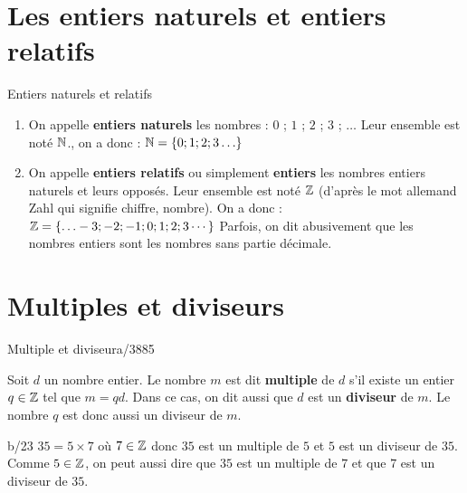 \begin{pageCours}


\section{Les entiers naturels et entiers relatifs}

\begin{DefLTQ}{Entiers naturels et relatifs}{}

\begin{enumerate}
\item On appelle \textbf{entiers naturels} les nombres : $0$ ; $1$ ; $2$ ; $3$ ; $\ldots$  Leur ensemble est noté $\mathbb N$., on a donc : $\mathbb N =  \lbrace 0 ; 1 ; 2 ; 3 \ldots \rbrace $
 
\item  On appelle \textbf{entiers relatifs} ou simplement \textbf{entiers} les nombres entiers naturels et leurs opposés. Leur ensemble est noté $\mathbb Z$ (d'après le mot allemand Zahl qui signifie chiffre, nombre).
On a donc : $\mathbb Z = \lbrace \ldots -3 ; -2 ; -1 ; 0 ; 1 ; 2 ; 3  \cdots  \rbrace$
Parfois, on dit abusivement que les nombres entiers sont les nombres sans partie décimale.
\end{enumerate}
\end{DefLTQ}

 
\section{Multiples et diviseurs}

\begin{minipage}{0.5\linewidth}

\begin{DefTQ}{Multiple et diviseur}{a/3885}

  Soit $d$ un nombre entier. Le nombre $m$ est dit \textbf{multiple} de $d$ s'il existe un entier $q \in \mathbb Z$ tel que $m=qd$. Dans ce cas, on dit aussi
  que $d$ est un \textbf{diviseur} de $m$. Le nombre $q$ est donc aussi un diviseur de $m$.
\end{DefTQ}
\end{minipage}
\begin{minipage}{0.5\linewidth}
\begin{ExTQ}{}{b/23} 
  $35=5 \times 7$ où $7 \in \mathbb Z$ donc $35$ est un multiple de $5$
  et $5$ est un diviseur de $35$. Comme $5 \in \mathbb Z$, on peut aussi
  dire que $35$ est un multiple de $7$ et que $7$ est un diviseur de
  $35$.
  

\end{ExTQ}
\end{minipage}
\end{pageCours}
